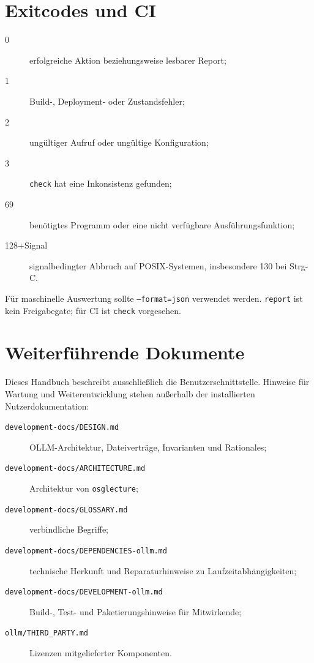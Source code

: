 \documentclass[
load-preamble+
]{osgdoc}
\begin{document}
\section{Exitcodes und CI}

\begin{description}
\item[0] erfolgreiche Aktion beziehungsweise lesbarer Report;
\item[1] Build-, Deployment- oder Zustandsfehler;
\item[2] ungültiger Aufruf oder ungültige Konfiguration;
\item[3] \texttt{check} hat eine Inkonsistenz gefunden;
\item[69] benötigtes Programm oder eine nicht verfügbare Ausführungsfunktion;
\item[128+Signal] signalbedingter Abbruch auf POSIX-Systemen, insbesondere
  130 bei Strg-C.
\end{description}

Für maschinelle Auswertung sollte \texttt{--format=json} verwendet werden.
\texttt{report} ist kein Freigabegate; für CI ist \texttt{check} vorgesehen.

\section{Weiterführende Dokumente}

Dieses Handbuch beschreibt ausschließlich die Benutzerschnittstelle. Hinweise
für Wartung und Weiterentwicklung stehen außerhalb der installierten
Nutzerdokumentation:

\begin{description}
\item[\texttt{development-docs/DESIGN.md}] OLLM-Architektur, Dateiverträge,
  Invarianten und Rationales;
\item[\texttt{development-docs/ARCHITECTURE.md}] Architektur von
  \texttt{osglecture};
\item[\texttt{development-docs/GLOSSARY.md}] verbindliche Begriffe;
\item[\texttt{development-docs/DEPENDENCIES-ollm.md}] technische Herkunft
  und Reparaturhinweise zu Laufzeitabhängigkeiten;
\item[\texttt{development-docs/DEVELOPMENT-ollm.md}] Build-, Test- und
  Paketierungshinweise für Mitwirkende;
\item[\texttt{ollm/THIRD\_PARTY.md}] Lizenzen mitgelieferter Komponenten.
\end{description}
\end{document}
